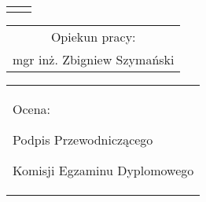 \begin{titlepage}
{\begin{center}
	\vspace*{7\baselineskip}
	\hfill\mbox{}\par\vspace*{\baselineskip}\noindent
	\begin{tabular}[b]{@{}p{3cm}@{\ }l@{}}
	    {\large\hfill } & {\large }
	\end{tabular}
	\hfill
	\begin{tabular}[b]{c}
		Opiekun pracy: \\
		{mgr inż. Zbigniew Szymański}
	\end{tabular}\par
	\vspace*{5\baselineskip}
    \begin{tabular}{p{\textwidth}}
    \begin{flushleft}
	\begin{minipage}{7cm}
	Ocena: \Dotfill
	\par\vspace{2.5\baselineskip}
	\Dotfill
	\vspace{0.5\baselineskip}
	\par\noindent
	\centerline{Podpis Przewodniczącego}
	\centerline{Komisji Egzaminu Dyplomowego}\par
	\end{minipage}
    \end{flushleft}
    \end{tabular}
    \end{center}}


\end{titlepage}
